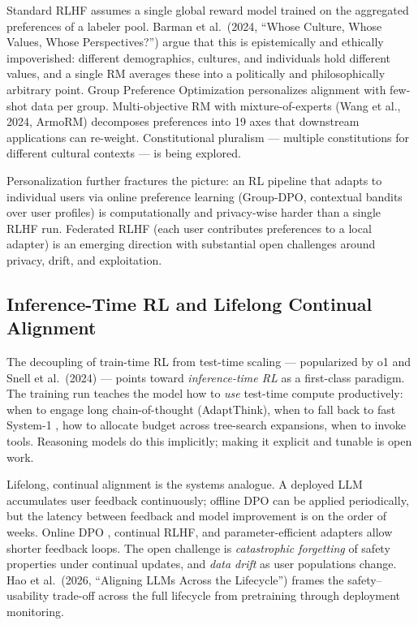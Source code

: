 \documentclass{article}
\begin{document}
Standard RLHF assumes a single global reward model trained on the aggregated preferences of a labeler pool. Barman et al.~(2024, ``Whose Culture, Whose Values, Whose Perspectives?'') argue that this is epistemically and ethically impoverished: different demographics, cultures, and individuals hold different values, and a single RM averages these into a politically and philosophically arbitrary point. Group Preference Optimization \citep{zhao2023grouppreferenceopt} personalizes alignment with few-shot data per group. Multi-objective RM with mixture-of-experts (Wang et al., 2024, ArmoRM) decomposes preferences into 19 axes that downstream applications can re-weight. Constitutional pluralism --- multiple constitutions for different cultural contexts --- is being explored.

Personalization further fractures the picture: an RL pipeline that adapts to individual users via online preference learning (Group-DPO, contextual bandits over user profiles) is computationally and privacy-wise harder than a single RLHF run. Federated RLHF (each user contributes preferences to a local adapter) is an emerging direction with substantial open challenges around privacy, drift, and exploitation.

\subsection{Inference-Time RL and Lifelong Continual Alignment}\label{inference-time-rl-and-lifelong-continual-alignment}

The decoupling of train-time RL from test-time scaling --- popularized by o1 and Snell et al.~(2024) --- points toward \emph{inference-time RL} as a first-class paradigm. The training run teaches the model how to \emph{use} test-time compute productively: when to engage long chain-of-thought (AdaptThink), when to fall back to fast System-1 \citep{zhang20252025}, how to allocate budget across tree-search expansions, when to invoke tools. Reasoning models do this implicitly; making it explicit and tunable is open work.

Lifelong, continual alignment is the systems analogue. A deployed LLM accumulates user feedback continuously; offline DPO can be applied periodically, but the latency between feedback and model improvement is on the order of weeks. Online DPO \citep{qi20232023}, continual RLHF, and parameter-efficient adapters allow shorter feedback loops. The open challenge is \emph{catastrophic forgetting} of safety properties under continual updates, and \emph{data drift} as user populations change. Hao et al.~(2026, ``Aligning LLMs Across the Lifecycle'') frames the safety--usability trade-off across the full lifecycle from pretraining through deployment monitoring.
\end{document}
